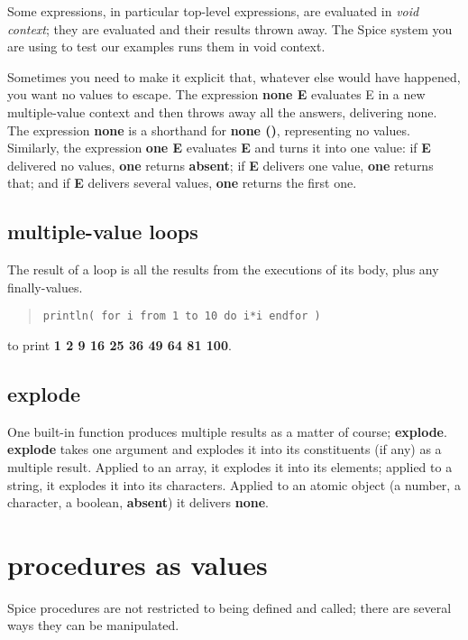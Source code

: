 \documentclass{report}
\begin{document}
Some expressions, in particular top-level expressions, are evaluated in {\em void
context}; they are evaluated and their results thrown away. The Spice system
you are using to test our examples runs them in void context.

Sometimes you need to make it explicit that, whatever else would have
happened, you want no values to escape. The expression {\bf none E} evaluates E in
a new multiple-value context and then throws away all the answers, delivering
none. The expression {\bf none} is a shorthand for {\bf none ()}, representing no
values. Similarly, the expression {\bf one E} evaluates {\bf E} and turns it into one
value: if {\bf E} delivered no values, {\bf one} returns {\bf absent}; if {\bf E} delivers one
value, {\bf one} returns that; and if {\bf E} delivers several values, {\bf one} returns
the first one.

\section{multiple-value loops}


The result of a loop is all the results from the executions of its body,
plus any finally-values.

\begin{quote}
\begin{verbatim}
println( for i from 1 to 10 do i*i endfor )
\end{verbatim}
\end{quote}


to print {\bf 1 2 9 16 25 36 49 64 81 100}.

\section{explode}


One built-in function produces multiple results as a matter of course;
{\bf explode}. {\bf explode} takes one argument and explodes it into its constituents
(if any) as a multiple result. Applied to an array, it explodes it into its
elements; applied to a string, it explodes it into its characters. Applied
to an atomic object (a number, a character, a boolean, {\bf absent}) it delivers
{\bf none}.\chapter{procedures as values}


Spice procedures are not restricted to being defined and called; there are
several ways they can be manipulated.
\end{document}
